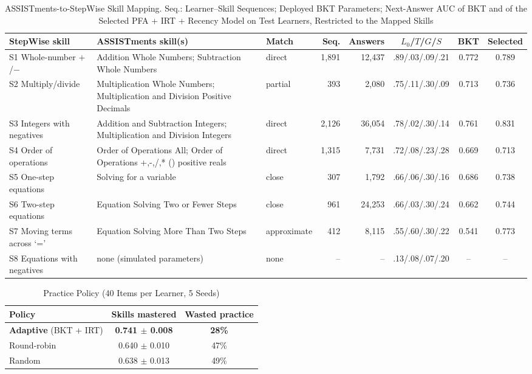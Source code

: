 \documentclass[conference]{IEEEtran}
\begin{document}
\begin{table}[!t]
\caption{ASSISTments-to-StepWise Skill Mapping. Seq.: Learner--Skill Sequences; Deployed BKT Parameters; Next-Answer AUC of BKT and of the Selected PFA + IRT + Recency Model on Test Learners, Restricted to the Mapped Skills}
\label{tab:skills}
\centering
\footnotesize
\begin{tabular}{L{2.9cm}L{5.0cm}lrrccc}
\toprule
StepWise skill & ASSISTments skill(s) & Match & Seq. & Answers & $L_0$/$T$/$G$/$S$ & BKT & Selected\\
\midrule
S1 Whole-number $+$/$-$ & Addition Whole Numbers; Subtraction Whole Numbers & direct & 1,891 & 12,437 & .89/.03/.09/.21 & 0.772 & 0.789\\
S2 Multiply/divide & Multiplication Whole Numbers; Multiplication and Division Positive Decimals & partial & 393 & 2,080 & .75/.11/.30/.09 & 0.713 & 0.736\\
S3 Integers with negatives & Addition and Subtraction Integers; Multiplication and Division Integers & direct & 2,126 & 36,054 & .78/.02/.30/.14 & 0.761 & 0.831\\
S4 Order of operations & Order of Operations All; Order of Operations +,-,/,* () positive reals & direct & 1,315 & 7,731 & .72/.08/.23/.28 & 0.669 & 0.713\\
S5 One-step equations & Solving for a variable & close & 307 & 1,792 & .66/.06/.30/.16 & 0.686 & 0.738\\
S6 Two-step equations & Equation Solving Two or Fewer Steps & close & 961 & 24,253 & .66/.03/.30/.24 & 0.662 & 0.744\\
S7 Moving terms across `=' & Equation Solving More Than Two Steps & approximate & 412 & 8,115 & .55/.60/.30/.22 & 0.541 & 0.773\\
S8 Equations with negatives & none (simulated parameters) & none & -- & -- & .13/.08/.07/.20 & -- & --\\
\bottomrule
\end{tabular}
\end{table}

\begin{table}[!t]
\caption{Practice Policy (40 Items per Learner, 5 Seeds)}
\label{tab:policy}
\centering
\footnotesize
\begin{tabular}{lcc}
\toprule
Policy & Skills mastered & Wasted practice\\
\midrule
\textbf{Adaptive} (BKT + IRT) & \textbf{0.741 $\pm$ 0.008} & \textbf{28\%}\\
Round-robin & 0.640 $\pm$ 0.010 & 47\%\\
Random & 0.638 $\pm$ 0.013 & 49\%\\
\bottomrule
\end{tabular}
\end{table}
\end{document}
